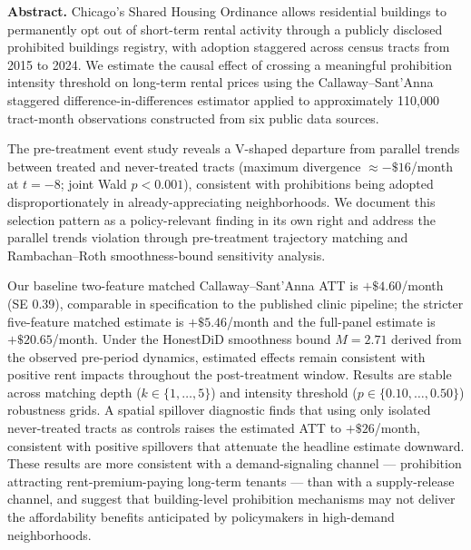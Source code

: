 \textbf{Abstract.}
Chicago's Shared Housing Ordinance allows residential buildings to permanently opt out of short-term rental activity through a publicly disclosed prohibited buildings registry, with adoption staggered across census tracts from 2015 to 2024.
We estimate the causal effect of crossing a meaningful prohibition intensity threshold on long-term rental prices using the Callaway--Sant'Anna staggered difference-in-differences estimator applied to approximately 110,000 tract-month observations constructed from six public data sources.

The pre-treatment event study reveals a V-shaped departure from parallel trends between treated and never-treated tracts (maximum divergence $\approx -\$16$/month at $t = -8$; joint Wald $p < 0.001$), consistent with prohibitions being adopted disproportionately in already-appreciating neighborhoods.
We document this selection pattern as a policy-relevant finding in its own right and address the parallel trends violation through pre-treatment trajectory matching and Rambachan--Roth smoothness-bound sensitivity analysis.

Our baseline two-feature matched Callaway--Sant'Anna ATT is $+\$4.60$/month (SE 0.39), comparable in specification to the published clinic pipeline; the stricter five-feature matched estimate is $+\$5.46$/month and the full-panel estimate is $+\$20.65$/month.
Under the HonestDiD smoothness bound $M = 2.71$ derived from the observed pre-period dynamics, estimated effects remain consistent with positive rent impacts throughout the post-treatment window.
Results are stable across matching depth ($k \in \{1,\ldots,5\}$) and intensity threshold ($p \in \{0.10,\ldots,0.50\}$) robustness grids.
A spatial spillover diagnostic finds that using only isolated never-treated tracts as controls raises the estimated ATT to $+\$26$/month, consistent with positive spillovers that attenuate the headline estimate downward.
These results are more consistent with a demand-signaling channel --- prohibition attracting rent-premium-paying long-term tenants --- than with a supply-release channel, and suggest that building-level prohibition mechanisms may not deliver the affordability benefits anticipated by policymakers in high-demand neighborhoods.
